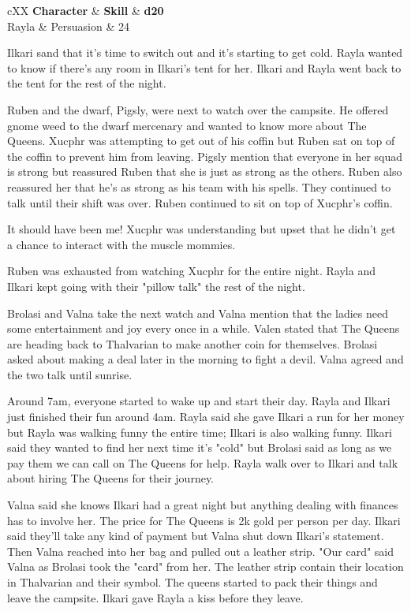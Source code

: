 \begin{DndTable}[color=PhbLightCyan]{cXX}
	\textbf{Character} & \textbf{Skill} & \textbf{d20} \\
	Rayla & Persuasion & 24\\
\end{DndTable}

Ilkari sand that it's time to switch out and it's starting to get cold. Rayla wanted to know if there's any room in Ilkari's tent for her.
Ilkari and Rayla went back to the tent for the rest of the night.

Ruben and the dwarf, Pigsly, were next to watch over the campsite. 
He offered gnome weed to the dwarf mercenary and wanted to know more about The Queens.
Xucphr was attempting to get out of his coffin but Ruben sat on top of the coffin to prevent him from leaving.
Pigsly mention that everyone in her squad is strong but reassured Ruben that she is just as strong as the others.
Ruben also reassured her that he's as strong as his team with his spells. 
They continued to talk until their shift was over. Ruben continued to sit on top of Xucphr's coffin.

\begin{DndSidebar}{It should have been me!}
	Xucphr was understanding but upset that he didn't get a chance to interact with the muscle mommies.
\end{DndSidebar}

Ruben was exhausted from watching Xucphr for the entire night. Rayla and Ilkari kept going with their "pillow talk" the rest of the night.

Brolasi and Valna take the next watch and Valna mention that the ladies need some entertainment and joy every once in a while.
Valen stated that The Queens are heading back to Thalvarian to make another coin for themselves.
Brolasi asked about making a deal later in the morning to fight a devil. Valna agreed and the two talk until sunrise.

Around 7am, everyone started to wake up and start their day. Rayla and Ilkari just finished their fun around 4am.
Rayla said she gave Ilkari a run for her money but Rayla was walking funny the entire time; Ilkari is also walking funny.
Ilkari said they wanted to find her next time it's "cold" but Brolasi said as long as we pay them we can call on The Queens for help.
Rayla walk over to Ilkari and talk about hiring The Queens for their journey.

Valna said she knows Ilkari had a great night but anything dealing with finances has to involve her.
The price for The Queens is 2k gold per person per day. Ilkari said they'll take any kind of payment but Valna shut down Ilkari's statement.
Then Valna reached into her bag and pulled out a leather strip. "Our card" said Valna as Brolasi took the "card" from her.
The leather strip contain their location in Thalvarian and their symbol.
The queens started to pack their things and leave the campsite. Ilkari gave Rayla a kiss before they leave.

